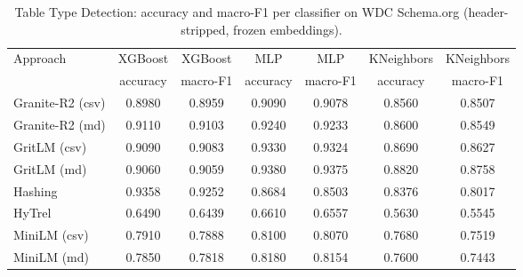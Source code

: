 \begin{table}[t]
\centering
\begin{tabular*}{\textwidth}{lcccccc}
\hline
Approach & \multicolumn{1}{c}{XGBoost} & \multicolumn{1}{c}{XGBoost} & \multicolumn{1}{c}{MLP} & \multicolumn{1}{c}{MLP} & \multicolumn{1}{c}{KNeighbors} & \multicolumn{1}{c}{KNeighbors} \\
 & accuracy & macro-F1 & accuracy & macro-F1 & accuracy & macro-F1 \\
\hline
Granite-R2 (csv) & 0.8980 & 0.8959 & 0.9090 & 0.9078 & 0.8560 & 0.8507 \\
Granite-R2 (md) & 0.9110 & 0.9103 & 0.9240 & 0.9233 & 0.8600 & 0.8549 \\
GritLM (csv) & 0.9090 & 0.9083 & 0.9330 & 0.9324 & 0.8690 & 0.8627 \\
GritLM (md) & 0.9060 & 0.9059 & 0.9380 & 0.9375 & 0.8820 & 0.8758 \\
Hashing & 0.9358 & 0.9252 & 0.8684 & 0.8503 & 0.8376 & 0.8017 \\
HyTrel & 0.6490 & 0.6439 & 0.6610 & 0.6557 & 0.5630 & 0.5545 \\
MiniLM (csv) & 0.7910 & 0.7888 & 0.8100 & 0.8070 & 0.7680 & 0.7519 \\
MiniLM (md) & 0.7850 & 0.7818 & 0.8180 & 0.8154 & 0.7600 & 0.7443 \\
\hline
\end{tabular*}
\caption{Table Type Detection: accuracy and macro-F1 per classifier on WDC Schema.org (header-stripped, frozen embeddings).}
\label{tab:ttd_classifier}
\end{table}
